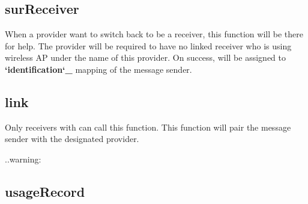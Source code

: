 \documentclass[letterpaper,10pt,english]{sphinxmanual}
\begin{document}
\subsection{surReceiver}
\label{\detokenize{PublicFunctions:surreceiver}}
%
\begin{sphinxVerbatim}[commandchars=\\\{\}]
   
\end{sphinxVerbatim}

When a provider want to switch back to be a receiver, this function will be there for help.
The provider will be required to have no linked receiver who is using wireless AP under the name of this provider.
On success,  will be assigned to {\color{red}\bfseries{}{}`identification{}`\_} mapping of the message sender.


\subsection{link}
\label{\detokenize{PublicFunctions:link}}
%
\begin{sphinxVerbatim}[commandchars=\\\{\}]
   
\end{sphinxVerbatim}

Only receivers with  can call this function.
This function will pair the message sender with the designated provider.

..warning:

%
\begin{sphinxVerbatim}[commandchars=\\\{\}]
                       
\end{sphinxVerbatim}


\subsection{usageRecord}
\label{\detokenize{PublicFunctions:usagerecord}}
%
\begin{sphinxVerbatim}[commandchars=\\\{\}]
     
\end{sphinxVerbatim}
\end{document}
